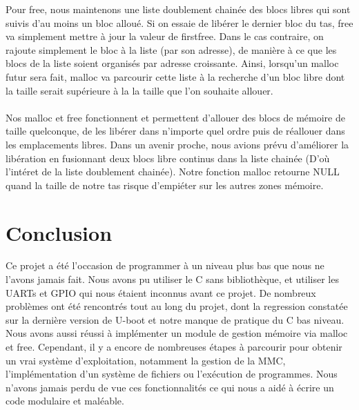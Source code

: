 \documentclass[frenchb]{article}
\begin{document}
Pour \textsf{free}, nous maintenons une liste doublement chainée des blocs libres qui sont suivis d'au moins un bloc alloué. Si on essaie de libérer le dernier bloc du tas, \textsf{free} va simplement mettre à jour la valeur de \textsf{firstfree}. Dans le cas contraire, on rajoute simplement le bloc à la liste (par son adresse), de manière à ce que les blocs de la liste soient organisés par adresse croissante. Ainsi, lorsqu'un \textsf{malloc} futur sera fait, \textsf{malloc} va parcourir cette liste à la recherche d'un bloc libre dont la taille serait supérieure à la la taille que l'on souhaite allouer. \\\\
Nos \textsf{malloc} et \textsf{free} fonctionnent et permettent d'allouer des blocs de mémoire de taille quelconque, de les libérer dans n'importe quel ordre puis de réallouer dans les emplacements libres. Dans un avenir proche, nous avions prévu d'améliorer la libération en fusionnant deux blocs libre continus dans la liste chainée (D'où l'intéret de la liste doublement chainée). Notre fonction \textsf{malloc} retourne \textsf{NULL} quand la taille de notre tas risque d'empiéter sur les autres zones mémoire. 

\clearpage

\section*{Conclusion}

\noindent Ce projet a été l'occasion de programmer à un niveau plus bas que nous ne l'avons jamais fait. Nous avons pu utiliser le C sans bibliothèque, et utiliser les UARTs et GPIO qui nous étaient inconnus avant ce projet.
De nombreux problèmes ont été rencontrés tout au long du projet, dont la regression constatée sur la dernière version de U-boot et notre manque de pratique du C bas niveau. 
Nous avons aussi réussi à implémenter un module de gestion mémoire via \textsf{malloc} et \textsf{free}.
Cependant, il y a encore de nombreuses étapes à parcourir pour obtenir un vrai système d'exploitation, notamment la gestion de la MMC, l'implémentation d'un système de fichiers ou l'exécution de programmes. Nous n'avons jamais perdu de vue ces fonctionnalités ce qui nous a aidé à écrire un code modulaire et maléable.
\end{document}
